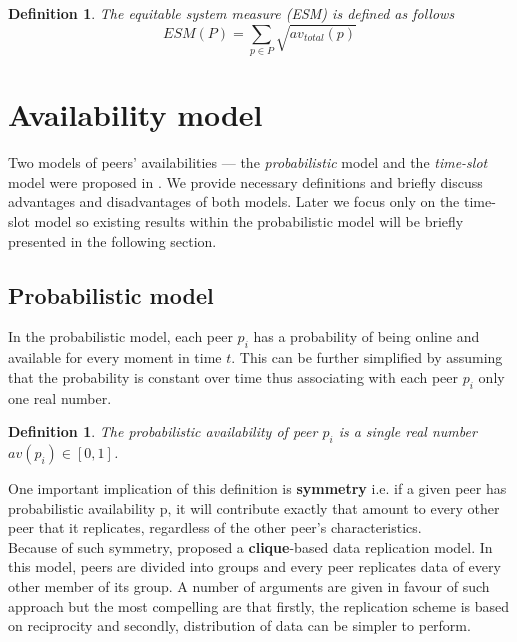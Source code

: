 \documentclass{pracamgren}
\newcounter{collective_ctr} \numberwithin{collective_ctr}{chapter}
\newtheorem{definition}[collective_ctr]{Definition}
\begin{document}
\begin{definition}
The {\it equitable system measure (ESM)} is defined as follows
$$ESM(P) = \sum_{p\in P} \sqrt{av_{total}(p)}$$
\end{definition}

\section{Availability model}\label{sect:ava}

Two models of peers' availabilities --- the {\it probabilistic} model and the {\it time-slot} model were proposed in \cite{krz}. We provide necessary definitions and briefly discuss advantages and disadvantages of both models. Later we focus only on the time-slot model so existing results within the probabilistic model will be briefly presented in the following section.

\subsection{Probabilistic model}


In the probabilistic model, each peer $p_i$ has a probability of being online and available for every moment in time $t$. This can be further simplified by assuming that the probability is constant over time thus associating with each peer $p_i$ only one real number.

\begin{definition}
The {\it probabilistic availability} of peer $p_i$ is a single real number $av(p_i) \in [0,1]$.
\end{definition}

One important implication of this definition is {\bf symmetry} i.e. if a given peer has probabilistic availability p, it will contribute exactly that amount to every other peer that it replicates, regardless of the other peer's characteristics.\\

Because of such symmetry, \cite{krz} proposed a {\bf clique}-based data replication model. In this model, peers are divided into groups and every peer replicates data of every other member of its group. A number of arguments are given in favour of such approach but the most compelling are that firstly, the replication scheme is based on reciprocity and secondly, distribution of data can be simpler to perform.\\
\end{document}
